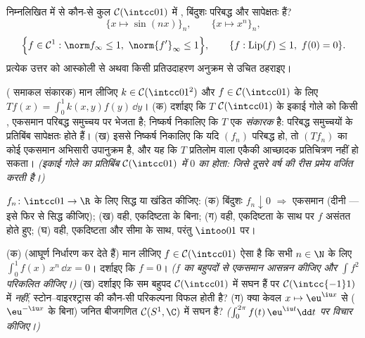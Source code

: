 \begin{exercise}[$\star\star$]\label{exo:b3:complete:6}
निम्नलिखित में से कौन-से कुल $\mathcal C(\intcc01)$ में , बिंदुशः परिबद्ध
और सापेक्षतः  हैं?
\[
\{x \mapsto \sin(nx)\}_{n},\qquad
\{x \mapsto x^n\}_n,
\]
\[
\Bigl\{f \in \mathcal C^1 : \norm f_\infty \leq 1,\
\norm{f'}_\infty \leq 1\Bigr\},\qquad
\{f : \operatorname{Lip}(f)\leq 1,\ f(0) = 0\}.
\]
प्रत्येक उत्तर को आस्कोली से अथवा किसी प्रतिउदाहरण अनुक्रम से
उचित ठहराइए।
\end{exercise}

\begin{exercise}[$\star\star\star$]\label{exo:b3:complete:7}
( समाकल संकारक) मान लीजिए $k \in \mathcal C(\intcc01^2)$ और $f \in \mathcal C(\intcc01)$ के लिए $Tf(x) =
\int_0^1k(x,y)f(y)\,\dd y$।
(क) दर्शाइए कि $T$ $\mathcal C(\intcc01)$ के इकाई गोले को किसी , एकसमान
परिबद्ध समुच्चय पर भेजता है; निष्कर्ष निकालिए कि $T$ एक
\emph{ संकारक} है: परिबद्ध समुच्चयों के प्रतिबिंब सापेक्षतः
\omterm{def:b3:topology:compact}{संहत} होते हैं।
(ख) इससे निष्कर्ष निकालिए कि यदि $(f_n)$ परिबद्ध हो, तो $(Tf_n)$ का
कोई एकसमान अभिसारी उपानुक्रम है, और यह कि $T$  प्रतिलोम
वाला एकैकी आच्छादक प्रतिचित्रण नहीं हो सकता। \emph{(इकाई गोले का
प्रतिबिंब $\mathcal C(\intcc01)$ में $0$ का   होता: जिसे दूसरे वर्ष
की रीस प्रमेय वर्जित करती है।)}
\end{exercise}

\begin{exercise}[$\star\star$]\label{exo:b3:complete:8}
 $f_n \colon \intcc01 \to \R$ के लिए सिद्ध या खंडित कीजिए:
(क) बिंदुशः $f_n \downarrow 0$ $\Rightarrow$ एकसमान (दीनी --- इसे फिर से सिद्ध
कीजिए); (ख) वही, एकदिष्टता के बिना; (ग) वही, एकदिष्टता के साथ पर
$f$ असंतत होते हुए; (घ) वही, एकदिष्टता और  सीमा के साथ,
परंतु $\intoo01$ पर।
\end{exercise}

\begin{exercise}[$\star\star$]\label{exo:b3:complete:9}
(क) (आघूर्ण निर्धारण कर देते हैं) मान लीजिए $f \in \mathcal C(\intcc01)$ ऐसा है कि सभी
$n \in \N$ के लिए $\int_0^1 f(x)\,x^n\,\dd x = 0$। दर्शाइए कि $f =
0$। \emph{($f$ का बहुपदों से
एकसमान आसन्नन कीजिए और $\int f^2$ परिकलित कीजिए।)}
(ख) दर्शाइए कि सम बहुपद $\mathcal
C(\intcc01)$ में सघन हैं पर $\mathcal C(\intcc{-1}1)$ में
\emph{नहीं}; स्टोन--वाइरश्ट्रास की कौन-सी परिकल्पना विफल होती है?
(ग) क्या केवल $x \mapsto \eu^{\iu x}$ से ($\eu^{-\iu x}$ के बिना) जनित बीजगणित $\mathcal C(S^1, \C)$ में
सघन है? \emph{($\int_0^{2\pi}f(t)\,\eu^{\iu t}\dd t$ पर विचार कीजिए।)}
\end{exercise}

